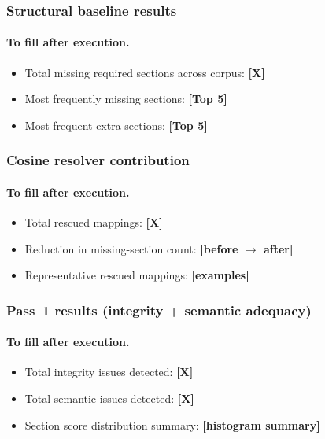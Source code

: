 \subsubsection{Structural baseline results}
\label{sec:eval_baseline_results}

\paragraph{To fill after execution.}
\begin{itemize}
    \item Total missing required sections across corpus: \textbf{[X]}
    \item Most frequently missing sections: \textbf{[Top 5]}
    \item Most frequent extra sections: \textbf{[Top 5]}
\end{itemize}

\subsubsection{Cosine resolver contribution}
\label{sec:eval_cosine_results}

\paragraph{To fill after execution.}
\begin{itemize}
    \item Total rescued mappings: \textbf{[X]}
    \item Reduction in missing-section count: \textbf{[before $\rightarrow$ after]}
    \item Representative rescued mappings: \textbf{[examples]}
\end{itemize}

\subsubsection{Pass~1 results (integrity + semantic adequacy)}
\label{sec:eval_pass1_results}

\paragraph{To fill after execution.}
\begin{itemize}
    \item Total integrity issues detected: \textbf{[X]}
    \item Total semantic issues detected: \textbf{[X]}
    \item Section score distribution summary: \textbf{[histogram summary]}
\end{itemize}

